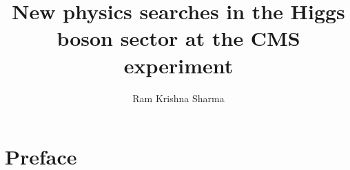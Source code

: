 \documentclass[11pt,a4paper]{postdoc_temp}
\author{Ram Krishna Sharma}
\title{New physics searches in the Higgs boson sector at the CMS experiment}
\begin{document}

\maketitle
\chapter*{Preface}



\tableofcontents
\listoffigures
\listoftables

\cuerpo
\setlength{\parskip}{0.75em}
















\appendix


\end{document}
